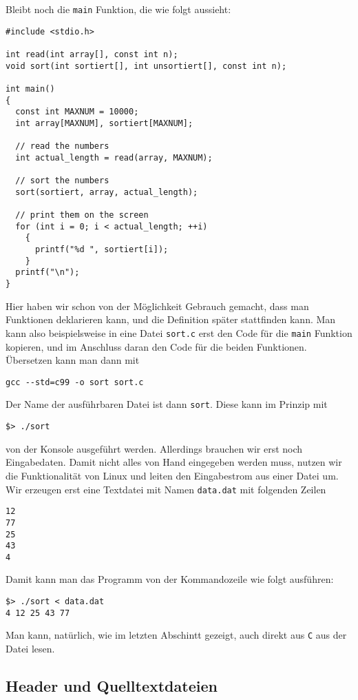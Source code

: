Bleibt noch die \verb|main| Funktion, die wie folgt aussieht:
\begin{lstlisting}
#include <stdio.h>

int read(int array[], const int n);
void sort(int sortiert[], int unsortiert[], const int n);

int main()
{
  const int MAXNUM = 10000;
  int array[MAXNUM], sortiert[MAXNUM];

  // read the numbers
  int actual_length = read(array, MAXNUM);

  // sort the numbers
  sort(sortiert, array, actual_length);

  // print them on the screen
  for (int i = 0; i < actual_length; ++i)
    {
      printf("%d ", sortiert[i]);
    }
  printf("\n");
}
\end{lstlisting}
Hier haben wir schon von der Möglichkeit Gebrauch gemacht, dass man Funktionen deklarieren kann, und die Definition später stattfinden kann.
Man kann also beispielsweise in eine Datei \verb|sort.c| erst den Code für die \verb|main| Funktion kopieren, und im Anschluss daran den Code für die beiden Funktionen.
Übersetzen kann man dann mit
\begin{verbatim}
gcc --std=c99 -o sort sort.c
\end{verbatim}
Der Name der ausführbaren Datei ist dann \verb|sort|.
Diese kann im Prinzip mit
\begin{verbatim}
$> ./sort
\end{verbatim}
von der Konsole ausgeführt werden.
Allerdings brauchen wir erst noch Eingabedaten.
Damit nicht alles von Hand eingegeben werden muss, nutzen wir die Funktionalität von Linux und leiten den Eingabestrom aus einer Datei um.
Wir erzeugen erst eine Textdatei mit Namen \verb|data.dat| mit folgenden Zeilen
\begin{verbatim}
12
77
25
43
4
\end{verbatim}
Damit kann man das Programm von der Kommandozeile wie folgt ausführen:
\begin{verbatim}
$> ./sort < data.dat
4 12 25 43 77
\end{verbatim}
Man kann, natürlich, wie im letzten Abschintt gezeigt, auch direkt aus \texttt{C} aus der Datei lesen.

\subsection{Header und Quelltextdateien}

